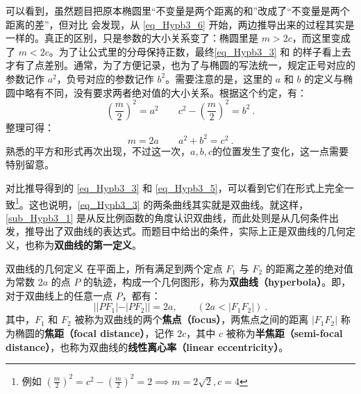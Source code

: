 可以看到，虽然题目把原本椭圆里“不变量是两个距离的和”改成了“不变量是两个距离的差”，但对比  会发现，从 \autoref{eq_Hypb3_6} 开始，两边推导出来的过程其实是一样的。真正的区别，只是参数的大小关系变了：椭圆里是 $m>2c$，而这里变成了 $m<2c$。为了让公式里的分母保持正数，最终\autoref{eq_Hypb3_3} 和  的样子看上去才有了点差别。通常，为了方便记录，也为了与椭圆的写法统一，规定正号对应的参数记作 $a^2$，负号对应的参数记作 $b^2$。需要注意的是，这里的 $a$ 和 $b$ 的定义与椭圆中略有不同，没有要求两者绝对值的大小关系。根据这个约定，有：
\begin{equation}\label{eq_Hypb3_10}
\left(\displaystyle\frac{m}{2}\right)^2=a^2\qquad c^2-\displaystyle\left(\frac{m}{2}\right)^2=b^2~.
\end{equation}
整理可得：
\begin{equation}\label{eq_Hypb3_12}
m=2a\qquad a^2+b^2=c^2~.
\end{equation}
熟悉的平方和形式再次出现，不过这一次，$a,b,c$的位置发生了变化，这一点需要特别留意。

对比推导得到的 \autoref{eq_Hypb3_3} 和 \autoref{eq_Hypb3_5}，可以看到它们在形式上完全一致\footnote{例如 $\displaystyle\left( \frac{m}{2} \right)^2 = c^2 - \left( \frac{m}{2} \right)^2 = 2\implies m = 2\sqrt{2}, c = 4$}。这也说明，\autoref{eq_Hypb3_3} 的两条曲线其实就是双曲线。就这样，\autoref{sub_Hypb3_1} 是从反比例函数的角度认识双曲线，而此处则是从几何条件出发，推导出了双曲线的表达式。而题目中给出的条件，实际上正是双曲线的几何定义，也称为\textbf{双曲线的第一定义}。

\begin{definition}{双曲线的几何定义}
在平面上，所有满足到两个定点 $F_1$ 与 $F_2$ 的距离之差的绝对值为常数 $2a$ 的点 $P$ 的轨迹，构成一个几何图形，称为\textbf{双曲线（hyperbola）}。即，对于双曲线上的任意一点 $P$，都有：
\begin{equation}
||PF_1| - |PF_2|| = 2a ,\qquad(2a<|F_1F_2|)~.
\end{equation}
其中，$F_1$ 和 $F_2$ 被称为双曲线的两个\textbf{焦点（focus）}，两焦点之间的距离 $|F_1F_2|$ 称为椭圆的\textbf{焦距（focal distance）}，记作 $2c$，其中 $c$ 被称为\textbf{半焦距（semi-focal distance）}，也称为双曲线的\textbf{线性离心率（linear eccentricity）}。
\end{definition}

